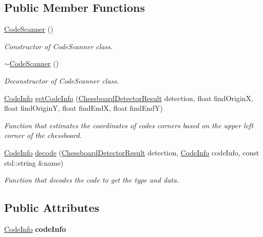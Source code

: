 \subsection*{Public Member Functions}
\begin{DoxyCompactItemize}
\item 
\mbox{\label{classCodeScanner_a3bcd2d58ba99d3489a82c39a7982d13b}} 
\hyperlink{classCodeScanner_a3bcd2d58ba99d3489a82c39a7982d13b}{Code\+Scanner} ()
\begin{DoxyCompactList}\small\item\em Constructor of Code\+Scanner class. \end{DoxyCompactList}\item 
\mbox{\label{classCodeScanner_a092360e7816a81de90384495bd0f3e44}} 
\hyperlink{classCodeScanner_a092360e7816a81de90384495bd0f3e44}{$\sim$\+Code\+Scanner} ()
\begin{DoxyCompactList}\small\item\em Deconstructor of Code\+Scanner class. \end{DoxyCompactList}\item 
\hyperlink{structCodeInfo}{Code\+Info} \hyperlink{classCodeScanner_a8ed0db374175da430110411dac1ceba1}{get\+Code\+Info} (\hyperlink{structChessboardDetectorResult}{Chessboard\+Detector\+Result} detection, float find\+OriginX, float find\+OriginY, float find\+EndX, float find\+EndY)
\begin{DoxyCompactList}\small\item\em Function that estimates the coordinates of code\textquotesingle{}s corners based on the upper left corner of the chessboard. \end{DoxyCompactList}\item 
\hyperlink{structCodeInfo}{Code\+Info} \hyperlink{classCodeScanner_a9660d74f2750b274d92396be1cd63ab4}{decode} (\hyperlink{structChessboardDetectorResult}{Chessboard\+Detector\+Result} detection, \hyperlink{structCodeInfo}{Code\+Info} code\+Info, const std\+::string \&name)
\begin{DoxyCompactList}\small\item\em Function that decodes the code to get the type and data. \end{DoxyCompactList}\end{DoxyCompactItemize}
\subsection*{Public Attributes}
\begin{DoxyCompactItemize}
\item 
\mbox{\label{classCodeScanner_a7f6371a29a0d630c9508c070f8c8966f}} 
\hyperlink{structCodeInfo}{Code\+Info} {\bfseries code\+Info}
\end{DoxyCompactItemize}


